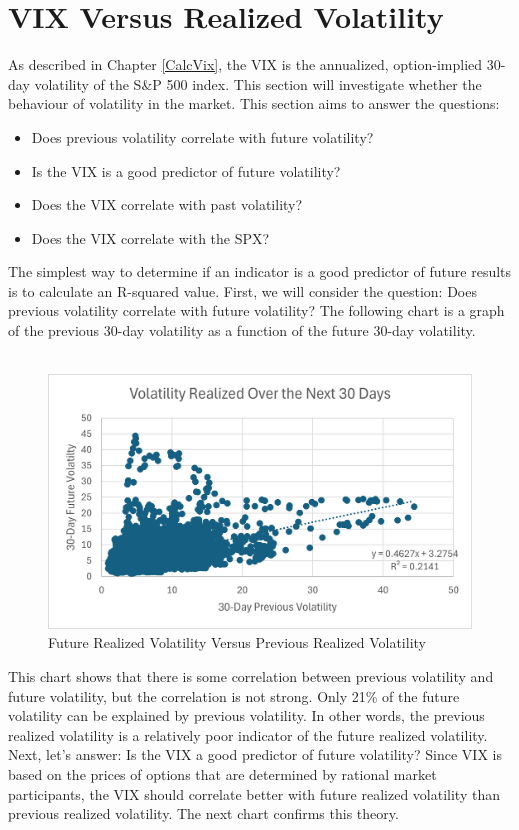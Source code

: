 \documentclass[11pt, oneside]{book}
\begin{document}
\section{VIX Versus Realized Volatility} \label{SigOfVIX-VIXVsReal}
As described in Chapter \ref{CalcVix}, the VIX is the annualized, option-implied 30-day volatility of the S\&P 500 index. This section will investigate whether the behaviour of volatility in the market. This section aims to answer the questions:
\begin{itemize}
    \item Does previous volatility correlate with future volatility?
    \item Is the VIX is a good predictor of future volatility?
    \item Does the VIX correlate with past volatility?
    \item Does the VIX correlate with the SPX?
\end{itemize} 
The simplest way to determine if an indicator is a good predictor of future results is to calculate an R-squared value. First, we will consider the question: Does previous volatility correlate with future volatility? The following chart is a graph of the previous 30-day volatility as a function of the future 30-day volatility.
\\
\\
\begin{figure}[H]
\centering
\includegraphics[width=\textwidth]{PreviousRealizedVolatilityVersusFutureRealizedVolatility.png}
\caption{Future Realized Volatility Versus Previous Realized Volatility} \label{Fig-FutureVersusPastVol}
\end{figure}
\noindent
This chart shows that there is some correlation between previous volatility and future volatility, but the correlation is not strong. Only 21\% of the future volatility can be explained by previous volatility. In other words, the previous realized volatility is a relatively poor indicator of the future realized volatility. Next, let's answer: Is the VIX a good predictor of future volatility? Since VIX is based on the prices of options that are determined by rational market participants, the VIX should correlate better with future realized volatility than previous realized volatility. The next chart confirms this theory.
\end{document}
